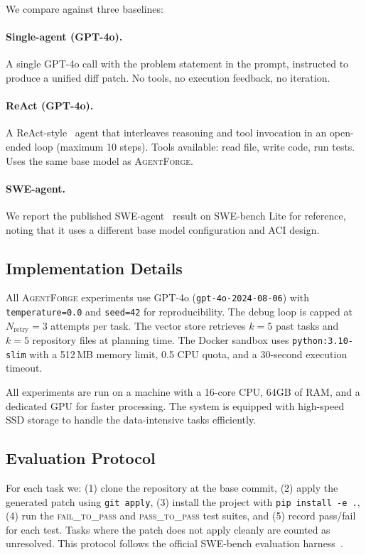 \documentclass[journal]{IEEEtran}
\newcommand{\agentforge}{\textsc{AgentForge}}
\begin{document}
We compare against three baselines:

\paragraph{Single-agent (GPT-4o).}
A single GPT-4o call with the problem statement in the prompt, instructed to produce a unified diff patch. No tools, no execution feedback, no iteration.

\paragraph{ReAct (GPT-4o).}
A ReAct-style~\cite{yao2023react} agent that interleaves reasoning and tool invocation in an open-ended loop (maximum 10 steps). Tools available: read file, write code, run tests. Uses the same base model as \agentforge{}.

\paragraph{SWE-agent.}
We report the published SWE-agent~\cite{yang2024sweagent} result on SWE-bench Lite for reference, noting that it uses a different base model configuration and ACI design.

\subsection{Implementation Details}

All \agentforge{} experiments use GPT-4o (\texttt{gpt-4o-2024-08-06}) with \texttt{temperature=0.0} and \texttt{seed=42} for reproducibility. The debug loop is capped at $N_\text{retry}=3$ attempts per task. The vector store retrieves $k=5$ past tasks and $k=5$ repository files at planning time. The Docker sandbox uses \texttt{python:3.10-slim} with a 512\,MB memory limit, 0.5 CPU quota, and a 30-second execution timeout.

All experiments are run on a machine with a 16-core CPU, 64GB of RAM, and a dedicated GPU for faster processing. The system is equipped with high-speed SSD storage to handle the data-intensive tasks efficiently.

\subsection{Evaluation Protocol}

For each task we: (1) clone the repository at the base commit, (2) apply the generated patch using \texttt{git apply}, (3) install the project with \texttt{pip install -e .}, (4) run the \textsc{fail\_to\_pass} and \textsc{pass\_to\_pass} test suites, and (5) record pass/fail for each test. Tasks where the patch does not apply cleanly are counted as unresolved. This protocol follows the official SWE-bench evaluation harness~\cite{jimenez2024swebench}.
\end{document}
